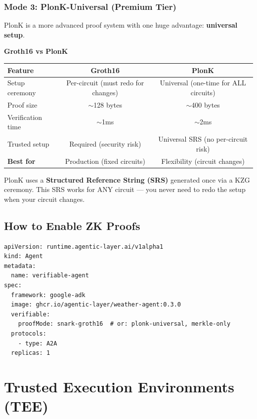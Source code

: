 \documentclass[12pt,a4paper,openany]{report}
\begin{document}
\subsection{Mode 3: PlonK-Universal (Premium Tier)}

PlonK is a more advanced proof system with one huge advantage: \textbf{universal setup}.

\begin{keyconceptbox}
\textbf{Groth16 vs PlonK}

\begin{tabular}{lcc}
\toprule
\textbf{Feature} & \textbf{Groth16} & \textbf{PlonK} \\
\midrule
Setup ceremony & Per-circuit (must redo for changes) & Universal (one-time for ALL circuits) \\
Proof size & $\sim$128 bytes & $\sim$400 bytes \\
Verification time & $\sim$1ms & $\sim$2ms \\
Trusted setup & Required (security risk) & Universal SRS (no per-circuit risk) \\
\textbf{Best for} & Production (fixed circuits) & Flexibility (circuit changes) \\
\bottomrule
\end{tabular}
\end{keyconceptbox}

PlonK uses a \textbf{Structured Reference String (SRS)} generated once via a KZG ceremony. This SRS works for ANY circuit — you never need to redo the setup when your circuit changes.

\section{How to Enable ZK Proofs}

\begin{lstlisting}[style=yaml, caption={Agent with Groth16 SNARK proofs}]
apiVersion: runtime.agentic-layer.ai/v1alpha1
kind: Agent
metadata:
  name: verifiable-agent
spec:
  framework: google-adk
  image: ghcr.io/agentic-layer/weather-agent:0.3.0
  verifiable:
    proofMode: snark-groth16  # or: plonk-universal, merkle-only
  protocols:
    - type: A2A
  replicas: 1
\end{lstlisting}


\chapter{Trusted Execution Environments (TEE)}
\end{document}

